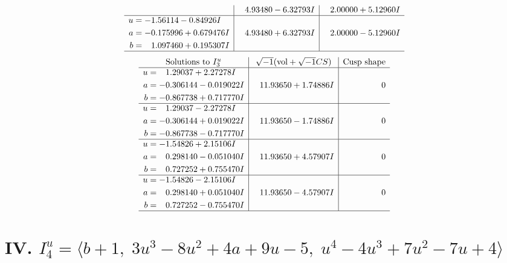 \documentclass[1p]{elsarticle_modified}
\theoremstyle{definition}
\newcommand{\I}{\sqrt{-1}}
\begin{document}
$$\begin{array}{c|c|c}
 & \phantom{-}4.93480 - 6.32793 I & \phantom{-}2.00000 + 5.12960 I \\ \hline\begin{aligned}
u &= -1.56114 - 0.84926 I \\
a &= -0.175996 + 0.679476 I \\
b &= \phantom{-}1.097460 + 0.195307 I\end{aligned}
 & \phantom{-}4.93480 + 6.32793 I & \phantom{-}2.00000 - 5.12960 I\\
 \hline 
 \end{array}$$\newpage$$\begin{array}{c|c|c}  
\text{Solutions to }I^u_{3}& \I (\text{vol} + \sqrt{-1}CS) & \text{Cusp shape}\\
 \hline 
\begin{aligned}
u &= \phantom{-}1.29037 + 2.27278 I \\
a &= -0.306144 - 0.019022 I \\
b &= -0.867738 + 0.717770 I\end{aligned}
 & \phantom{-}11.93650 + 1.74886 I & \phantom{-0.000000 } 0 \\ \hline\begin{aligned}
u &= \phantom{-}1.29037 - 2.27278 I \\
a &= -0.306144 + 0.019022 I \\
b &= -0.867738 - 0.717770 I\end{aligned}
 & \phantom{-}11.93650 - 1.74886 I & \phantom{-0.000000 } 0 \\ \hline\begin{aligned}
u &= -1.54826 + 2.15106 I \\
a &= \phantom{-}0.298140 - 0.051040 I \\
b &= \phantom{-}0.727252 + 0.755470 I\end{aligned}
 & \phantom{-}11.93650 + 4.57907 I & \phantom{-0.000000 } 0 \\ \hline\begin{aligned}
u &= -1.54826 - 2.15106 I \\
a &= \phantom{-}0.298140 + 0.051040 I \\
b &= \phantom{-}0.727252 - 0.755470 I\end{aligned}
 & \phantom{-}11.93650 - 4.57907 I & \phantom{-0.000000 } 0\\
 \hline 
 \end{array}$$\newpage\newpage\renewcommand{\arraystretch}{1}
\centering \section*{IV. $I^u_{4}= \langle b+1,\;3 u^3-8 u^2+4 a+9 u-5,\;u^4-4 u^3+7 u^2-7 u+4 \rangle$}
\end{document}
